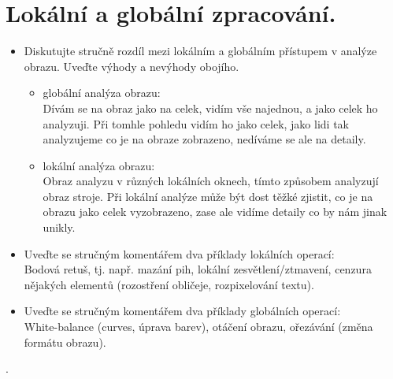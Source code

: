 \section{Lokální a globální zpracování.}
\begin{itemize}
  \item Diskutujte stručně rozdíl mezi lokálním a globálním přístupem v analýze obrazu. Uveďte výhody a nevýhody 
    obojího.
    \begin{itemize}
      \item{globální analýza obrazu:\\}
        Dívám se na obraz jako na celek, vidím vše najednou, a jako celek ho analyzuji.
        Při tomhle pohledu vidím ho jako celek, jako lidi tak analyzujeme co je na obraze zobrazeno, nedíváme se ale na detaily.
      \item{lokální analýza obrazu:\\}
        Obraz analyzu v různých lokálních oknech, tímto způsobem analyzují obraz stroje.
        Při lokální analýze může být dost těžké zjistit, co je na obrazu jako celek vyzobrazeno, zase ale vidíme detaily co by nám jinak unikly.
    \end{itemize}
  \item{Uveďte se stručným komentářem dva příklady lokálních operací\footnotemark{}:\\}
    Bodová retuš, tj. např. mazání pih, lokální zesvětlení/ztmavení, cenzura nějakých elementů (rozostření obličeje, rozpixelování textu).
  \item{Uveďte se stručným komentářem dva příklady globálních operací\footnotemark[\value{footnote}]{}:\\}
    White-balance (curves, úprava barev), otáčení obrazu, ořezávání (změna formátu obrazu).
\end{itemize}.
